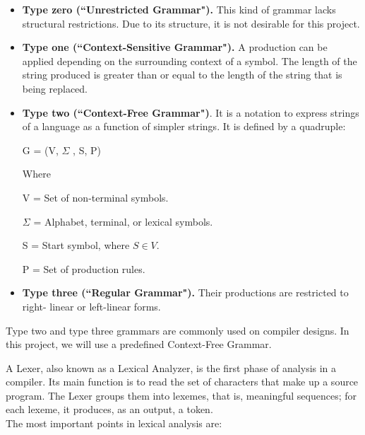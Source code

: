 \documentclass[letterpaper,12pt,oneside]{article}
\begin{document}
\begin{itemize}
\item \textbf{Type zero (``Unrestricted Grammar").} This kind of grammar lacks structural restrictions. Due to its structure, it is not desirable for this project.
\item \textbf{Type one (``Context-Sensitive Grammar").} A production can be applied depending on the surrounding context of a symbol. The length of the string produced is greater than or equal to the length of the string that is being replaced.
\item \textbf{Type two (``Context-Free Grammar")}. It is a notation to express strings of a language as a function of simpler strings. It is defined by a quadruple:

\begin{center}
G = (V, \(\Sigma\) , S, P)
\end{center}
Where

V = Set of non-terminal symbols.

 \(\Sigma\) = Alphabet, terminal, or lexical symbols.

S = Start symbol, where $S \in V$.

P = Set of production rules. \cite{unam_glc}

\item \textbf{Type three (``Regular Grammar").} Their productions are restricted to right- linear or left-linear forms.

\end{itemize}

Type two and type three grammars are commonly used on compiler designs. In this project, we will use a predefined Context-Free Grammar.

\bigskip

A Lexer, also known as a Lexical Analyzer, is the first phase of analysis in a compiler. Its main function is to read the set of characters that make up a source program. The Lexer groups them into lexemes, that is, meaningful sequences; for each lexeme, it produces, as an output, a token.\\

The most important points in lexical analysis are:
\end{document}
